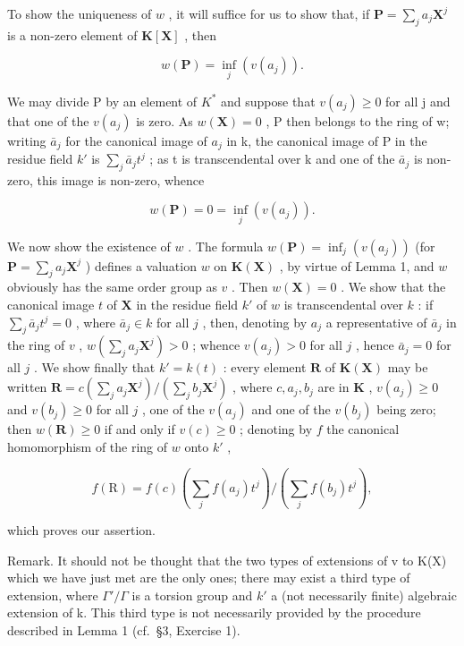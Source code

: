 To show the uniqueness of \(w\) , it will suffice for us to show that, if \(\mathbf{P} = \sum_{j} a_j \mathbf{X}^j\) is a non-zero element of \(\mathbf{K}[\mathbf{X}]\) , then

\[
w (\mathbf {P}) = \inf _ {j} (v (a _ {j})).
\]

We may divide P by an element of \(K^{*}\) and suppose that \(v(a_{j}) \geqslant 0\) for all j and that one of the \(v(a_{j})\) is zero. As \(w(\mathbf{X}) = 0\) , P then belongs to the ring of w; writing \(\bar{a}_{j}\) for the canonical image of \(a_{j}\) in k, the canonical image of P in the residue field \(k'\) is \(\sum_{j} \bar{a}_{j} t^{j}\) ; as t is transcendental over k and one of the \(\bar{a}_{j}\) is non-zero, this image is non-zero, whence

\[
w (\mathbf {P}) = 0 = \inf _ {j} (v (a _ {j})).
\]

We now show the existence of \(w\) . The formula \(w(\mathbf{P}) = \inf_{j}(v(a_j))\) (for \(\mathbf{P} = \sum_{j} a_j \mathbf{X}^j\) ) defines a valuation \(w\) on \(\mathbf{K}(\mathbf{X})\) , by virtue of Lemma 1, and \(w\) obviously has the same order group as \(v\) . Then \(w(\mathbf{X}) = 0\) . We show that the canonical image \(t\) of \(\mathbf{X}\) in the residue field \(k'\) of \(w\) is transcendental over \(k\) : if \(\sum_{j} \bar{a}_j t^j = 0\) , where \(\bar{a}_j \in k\) for all \(j\) , then, denoting by \(a_j\) a representative of \(\bar{a}_j\) in the ring of \(v\) , \(w\left(\sum_{j} a_j \mathbf{X}^j\right) > 0\) ; whence \(v(a_j) > 0\) for all \(j\) , hence \(\bar{a}_j = 0\) for all \(j\) . We show finally that \(k' = k(t)\) : every element \(\mathbf{R}\) of \(\mathbf{K}(\mathbf{X})\) may be written \(\mathbf{R} = c\left(\sum_{j} a_j \mathbf{X}^j\right) / \left(\sum_{j} b_j \mathbf{X}^j\right)\) , where \(c, a_j, b_j\) are in \(\mathbf{K}\) , \(v(a_j) \geqslant 0\) and \(v(b_j) \geqslant 0\) for all \(j\) , one of the \(v(a_j)\) and one of the \(v(b_j)\) being zero; then \(w(\mathbf{R}) \geqslant 0\) if and only if \(v(c) \geqslant 0\) ; denoting by \(f\) the canonical homomorphism of the ring of \(w\) onto \(k'\) ,

\[
f (\mathrm{R}) = f (c) \left(\sum_ {j} f (a _ {j}) t ^ {j}\right) / \left(\sum_ {j} f (b _ {j}) t ^ {j}\right),
\]

which proves our assertion.

Remark. It should not be thought that the two types of extensions of v to K(X) which we have just met are the only ones; there may exist a third type of extension, where \(\Gamma'/\Gamma\) is a torsion group and \(k'\) a (not necessarily finite) algebraic extension of k. This third type is not necessarily provided by the procedure described in Lemma 1 (cf.~§3, Exercise 1).

